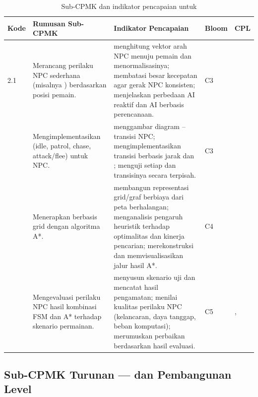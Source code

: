 \begin{table}[htbp]
\centering
\caption{Sub-CPMK dan indikator pencapaian untuk }
\label{tab:subcpmk2}
\begin{tabularx}{\textwidth}{@{}L{1.5cm} L{3.9cm} Y L{1.5cm} L{2.4cm}@{}}
\toprule
\headrow \textbf{Kode} & \textbf{Rumusan Sub-CPMK} & \textbf{Indikator Pencapaian} & \textbf{Bloom} & \textbf{CPL} \\
 &
Merancang perilaku NPC sederhana (misalnya ) berdasarkan posisi pemain. &
 menghitung vektor arah NPC menuju pemain dan menormalisasinya;
 membatasi besar kecepatan agar gerak NPC konsisten;
 menjelaskan perbedaan AI reaktif dan AI berbasis perencanaan. &
C3 &  \\
 &
Mengimplementasikan  (idle, patrol, chase, attack/flee) untuk NPC. &
 menggambar diagram --transisi NPC;
 mengimplementasikan transisi berbasis jarak dan ;
 menguji setiap  dan transisinya secara terpisah. &
C3 &  \\
 &
Menerapkan  berbasis grid dengan algoritma A*. &
 membangun representasi grid/graf berbiaya dari peta berhalangan;
 menganalisis pengaruh heuristik terhadap optimalitas dan kinerja pencarian;
 merekonstruksi dan memvisualisasikan jalur hasil A*. &
C4 &  \\
 &
Mengevaluasi perilaku NPC hasil kombinasi FSM dan A* terhadap skenario permainan. &
 menyusun skenario uji dan mencatat hasil pengamatan;
 menilai kualitas perilaku NPC (kelancaran, daya tanggap, beban komputasi);
 merumuskan perbaikan berdasarkan hasil evaluasi. &
C5 & ,  \\
\bottomrule
\end{tabularx}
\end{table}

\subsection{Sub-CPMK Turunan  ---  dan Pembangunan Level}

